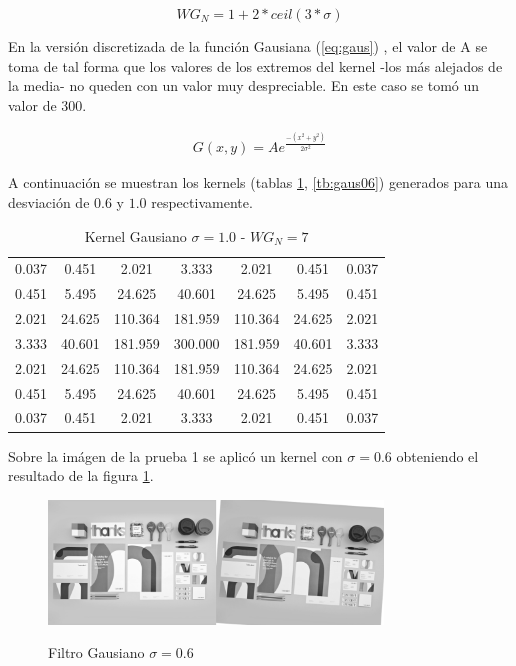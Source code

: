 \documentclass{IEEEtran}
\begin{document}
\begin{equation}
WG_{N} = 1 + 2 * ceil( 3 * \sigma )
\label{eq:wgaus}
\end{equation} 

En la versión discretizada de la función Gausiana (\ref{eq:gaus}) , el valor de A se toma de tal forma
que los valores de los extremos del kernel -los más alejados de la media- no queden
con un valor muy despreciable. En este caso se tomó un valor de 300.

\begin{equation}
\begin{aligned}
G(x,y) = A e^{\frac{-(x^2 + y^2)}{2 \sigma^2}}
\label{eq:gaus}
\end{aligned}
\end{equation} 

A continuación se muestran los kernels (tablas \ref{tb:gaus1}, \ref{tb:gaus06}) 
generados para una desviación de $0.6$ y $1.0$ respectivamente.

\begin{table}[H]
\centering
\begin{tabular}{|*7c|}
\hline
 0.037& 0.451& 2.021& 3.333& 2.021& 0.451& 0.037\\
 0.451& 5.495& 24.625& 40.601& 24.625& 5.495& 0.451\\
 2.021& 24.625& 110.364& 181.959& 110.364& 24.625& 2.021\\
 3.333& 40.601& 181.959& 300.000& 181.959& 40.601& 3.333\\
 2.021& 24.625& 110.364& 181.959& 110.364& 24.625& 2.021\\
 0.451& 5.495& 24.625& 40.601& 24.625& 5.495& 0.451\\
 0.037& 0.451& 2.021& 3.333& 2.021& 0.451& 0.037\\
\hline
\end{tabular}
\caption{Kernel Gausiano $\sigma = 1.0$ - $WG_{N}=7$}
\label{tb:gaus1}
\end{table} 

Sobre la imágen de la prueba 1 se aplicó un kernel con $\sigma=0.6$ 
obteniendo el resultado de la figura \ref{fig:gaus06}.

\begin{figure}[H]
\caption{Filtro Gausiano $\sigma = 0.6$}
\centering
\includegraphics[width=8.9cm,natwidth=1200,natheight=450]{figs/gaus06.png}
\label{fig:gaus06}
\end{figure} 
\end{document}
